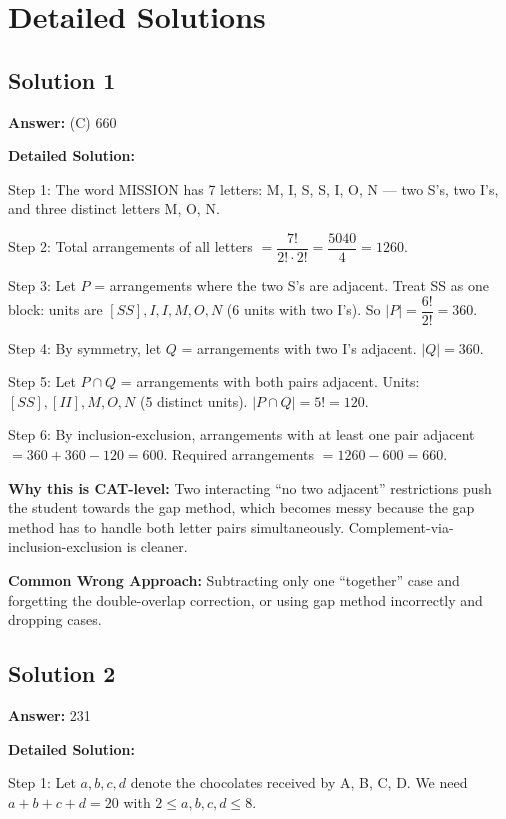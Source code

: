 \documentclass[11pt]{article}
\begin{document}
\newpage

\section*{Detailed Solutions}

\subsection*{Solution 1}
\textbf{Answer:} (C) 660

\textbf{Detailed Solution:}

Step 1: The word MISSION has 7 letters: M, I, S, S, I, O, N --- two S's, two I's, and three distinct letters M, O, N.

Step 2: Total arrangements of all letters \( = \dfrac{7!}{2! \cdot 2!} = \dfrac{5040}{4} = 1260 \).

Step 3: Let \( P \) = arrangements where the two S's are adjacent. Treat SS as one block: units are \([SS], I, I, M, O, N\) (6 units with two I's). So \( |P| = \dfrac{6!}{2!} = 360 \).

Step 4: By symmetry, let \( Q \) = arrangements with two I's adjacent. \( |Q| = 360 \).

Step 5: Let \( P \cap Q \) = arrangements with both pairs adjacent. Units: \([SS], [II], M, O, N\) (5 distinct units). \( |P \cap Q| = 5! = 120 \).

Step 6: By inclusion-exclusion, arrangements with at least one pair adjacent \( = 360 + 360 - 120 = 600 \). Required arrangements \( = 1260 - 600 = 660 \).

\textbf{Why this is CAT-level:} Two interacting ``no two adjacent'' restrictions push the student towards the gap method, which becomes messy because the gap method has to handle both letter pairs simultaneously. Complement-via-inclusion-exclusion is cleaner.

\textbf{Common Wrong Approach:} Subtracting only one ``together'' case and forgetting the double-overlap correction, or using gap method incorrectly and dropping cases.

\subsection*{Solution 2}
\textbf{Answer:} 231

\textbf{Detailed Solution:}

Step 1: Let \( a, b, c, d \) denote the chocolates received by A, B, C, D. We need \( a + b + c + d = 20 \) with \( 2 \le a, b, c, d \le 8 \).
\end{document}

